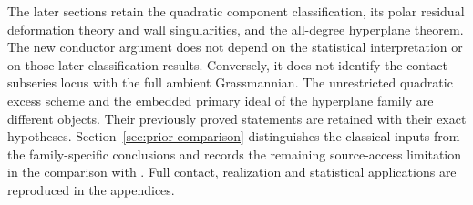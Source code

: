 The later sections retain the quadratic component classification,
its polar residual deformation theory and wall singularities, and
the all-degree hyperplane theorem. The new conductor argument does
not depend on the statistical interpretation or on those later
classification results. Conversely, it does not identify the
contact-subseries locus with the full ambient Grassmannian. The
unrestricted quadratic excess scheme and the embedded primary ideal
of the hyperplane family are different objects. Their previously
proved statements are retained with their exact hypotheses.
Section~\ref{sec:prior-comparison} distinguishes the classical
inputs from the family-specific conclusions and records the
remaining source-access limitation in the comparison with
\cite{Ballico93}. Full contact, realization and statistical
applications are reproduced in the appendices.
